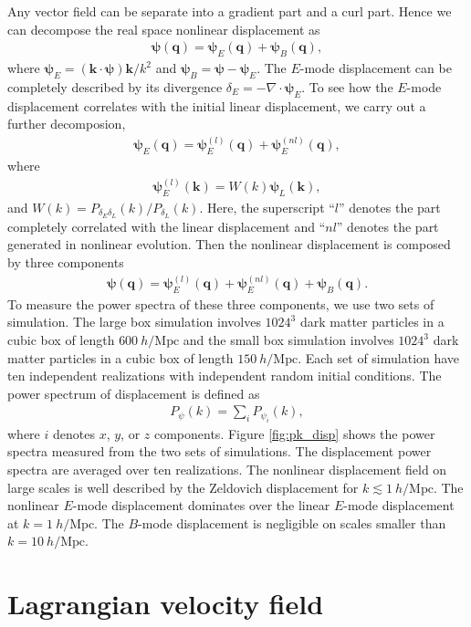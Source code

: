\documentclass[aps,prd,twocolumn,superscriptaddress,groupedaddress,nofootinbib,amsfont]{revtex4}  %
\newcommand{\mr}{\mathrm}
\newcommand{\bea}{\begin{eqnarray}}
\newcommand{\eea}{\end{eqnarray}}
\newcommand{\bmp}{\bm{\psi}}
\newcommand{\bmk}{\bm{k}}
\newcommand{\bmq}{\bm{q}}
\begin{document}
Any vector field can be separate into a gradient part and a curl part. 
Hence we can decompose the real space nonlinear displacement as
\bea
\bmp(\bmq)=\bmp_E(\bmq)+\bmp_B(\bmq),
\eea
where $\bmp_E=(\bmk\cdot\bmp)\bmk/k^2$ and $\bmp_B=\bmp-\bmp_E$.
The $E$-mode displacement can be completely described by its divergence 
$\delta_E=-\nabla\cdot\bmp_E$. 
To see how the $E$-mode displacement correlates with the initial linear 
displacement, we carry out a further decomposion,
\bea
\bmp_E(\bmq)=\bmp_E^{(l)}(\bmq)+\bmp_E^{(nl)}(\bmq),
\eea
where
\bea
\bmp_E^{(l)}(\bmk)=W(k)\bmp_L(\bmk),
\eea
and $W(k)={P_{\delta_E\delta_L}(k)}/{P_{\delta_L}(k)}$.
Here, the superscript ``$l$'' denotes the part completely correlated with the 
linear displacement and ``$nl$'' denotes the part generated in nonlinear 
evolution.
Then the nonlinear displacement is composed by three components
\bea
\bmp(\bmq)=\bmp^{(l)}_E(\bmq)+\bmp^{(nl)}_E(\bmq)+\bmp_B(\bmq).
\eea
To measure the power spectra of these three components, we use two sets of simulation. The large box simulation involves $1024^3$ dark matter particles in a 
cubic box of length $600\ h/\mr{Mpc}$ and the small box simulation involves
$1024^3$ dark matter particles in a cubic box of length $150\ h/\mr{Mpc}$.
Each set of simulation have ten independent realizations with independent random
initial conditions.
The power spectrum of displacement is defined as 
\bea
P_\psi(k)=\sum_iP_{\psi_i}(k),
\eea
where $i$ denotes $x$, $y$, or $z$ components.
Figure \ref{fig:pk_disp} shows the power spectra measured from the two sets of
simulations. The displacement power spectra are averaged over ten realizations.
The nonlinear displacement field on large scales is well described by the 
Zeldovich displacement for $k\lesssim1\ h/\mr{Mpc}$.
The nonlinear $E$-mode displacement dominates over the linear $E$-mode displacement at $k=1\ h/\mr{Mpc}$. The $B$-mode displacement is negligible on scales 
smaller than $k=10\ h/\mr{Mpc}$.


\section{Lagrangian velocity field}
\label{appendix:B}
\end{document}
